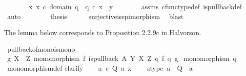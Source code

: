 \begin{isabellebody}
\ \ \ \ \isamarkupfalse%
\ \isamarkupfalse%
\ {\isachardoublequoteopen}{\isasymexists}x{\isachardot}{\kern0pt}\ x\ {\isasymin}\isactrlsub c\ domain\ q{}\ {\isasymand}\ q{}\ {\isasymcirc}\isactrlsub c\ x\ {\isacharequal}{\kern0pt}\ y{\isachardoublequoteclose}\isanewline
\ \ \ \ \ \ \isamarkupfalse%
\ assms{\isacharparenleft}{\kern0pt}{}{\isacharparenright}{\kern0pt}\ cfunc{\isacharunderscore}{\kern0pt}type{\isacharunderscore}{\kern0pt}def\ is{\isacharunderscore}{\kern0pt}pullback{\isacharunderscore}{\kern0pt}def\ \ \isamarkupfalse%
\ auto\isanewline
\ \ \isamarkupfalse%
\isanewline
\ \ \isamarkupfalse%
\ \isamarkupfalse%
\ {\isacharquery}{\kern0pt}thesis\isanewline
\ \ \ \ \isamarkupfalse%
\ surjective{\isacharunderscore}{\kern0pt}is{\isacharunderscore}{\kern0pt}epimorphism\ \isamarkupfalse%
\ blast\isanewline
{}\isamarkupfalse%
%
\endisatagproof
{\isafoldproof}%
%
\isadelimproof
%
\endisadelimproof
%
\begin{isamarkuptext}%
The lemma below corresponds to Proposition 2.2.9c in Halvorson.%
\end{isamarkuptext}\isamarkuptrue%
\isamarkupfalse%
\ pullback{\isacharunderscore}{\kern0pt}of{\isacharunderscore}{\kern0pt}mono{\isacharunderscore}{\kern0pt}is{\isacharunderscore}{\kern0pt}mono{}{\isacharcolon}{\kern0pt}\isanewline
{}\ {\isachardoublequoteopen}g{\isacharcolon}{\kern0pt}\ X\ {\isasymrightarrow}\ Z{\isachardoublequoteclose}\ {\isachardoublequoteopen}monomorphism\ f{\isachardoublequoteclose}\ {\isachardoublequoteopen}is{\isacharunderscore}{\kern0pt}pullback\ A\ Y\ X\ Z\ q{}\ f\ q{}\ g{\isachardoublequoteclose}\isanewline
{}\ {\isachardoublequoteopen}monomorphism\ q{}{\isachardoublequoteclose}\ \isanewline
%
\isadelimproof
\ \ %
\endisadelimproof
%
\isatagproof
{}\isamarkupfalse%
\ monomorphism{\isacharunderscore}{\kern0pt}def{}\isanewline
{}\isamarkupfalse%
{\isacharparenleft}{\kern0pt}clarify{\isacharparenright}{\kern0pt}\isanewline
\ \ \isamarkupfalse%
\ u\ v\ Q\ a\ x\isanewline
\ \ \isamarkupfalse%
\ u{\isacharunderscore}{\kern0pt}type{\isacharcolon}{\kern0pt}\ {\isachardoublequoteopen}u\ {\isacharcolon}{\kern0pt}\ Q\ {\isasymrightarrow}\ a{\isachardoublequoteclose}\ \ \isanewline
\ \ \isamarkupfalse%

\end{isabellebody}
